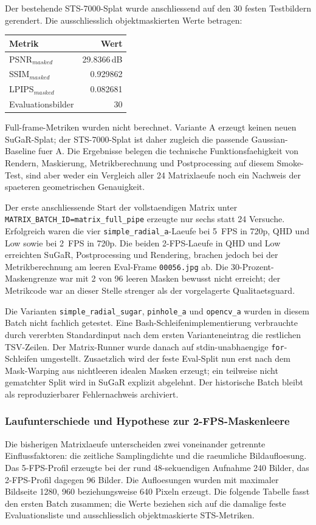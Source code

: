 \documentclass[12pt,a4paper]{article}
\begin{document}
Der bestehende STS-7000-Splat wurde anschliessend auf den 30 festen Testbildern
gerendert. Die ausschliesslich objektmaskierten Werte betragen:
\begin{center}
\begin{tabular}{l r}
\textbf{Metrik} & \textbf{Wert}\\
\hline
PSNR$_{masked}$ & 29.8366\,dB\\
SSIM$_{masked}$ & 0.929862\\
LPIPS$_{masked}$ & 0.082681\\
Evaluationsbilder & 30\\
\end{tabular}
\end{center}
Full-frame-Metriken wurden nicht berechnet. Variante A erzeugt keinen neuen
SuGaR-Splat; der STS-7000-Splat ist daher zugleich die passende Gaussian-
Baseline fuer A. Die Ergebnisse belegen die technische Funktionsfaehigkeit von
Rendern, Maskierung, Metrikberechnung und Postprocessing auf diesem
Smoke-Test, sind aber weder ein Vergleich aller 24 Matrixlaeufe noch ein
Nachweis der spaeteren geometrischen Genauigkeit.

Der erste anschliessende Start der vollstaendigen Matrix unter
\texttt{MATRIX\_BATCH\_ID=matrix\_full\_pipe} erzeugte nur sechs statt 24
Versuche. Erfolgreich waren die vier \texttt{simple\_radial\_a}-Laeufe bei
5~FPS in 720p, QHD und Low sowie bei 2~FPS in 720p. Die beiden 2-FPS-Laeufe in
QHD und Low erreichten SuGaR, Postprocessing und Rendering, brachen jedoch bei
der Metrikberechnung am leeren Eval-Frame \texttt{00056.jpg} ab. Die
30-Prozent-Maskengrenze war mit 2 von 96 leeren Masken bewusst nicht erreicht;
der Metrikcode war an dieser Stelle strenger als der vorgelagerte
Qualitaetsguard.

Die Varianten \texttt{simple\_radial\_sugar}, \texttt{pinhole\_a} und
\texttt{opencv\_a} wurden in diesem Batch nicht fachlich getestet. Eine
Bash-Schleifenimplementierung verbrauchte durch vererbten Standardinput nach
dem ersten Varianteneintrag die restlichen TSV-Zeilen. Der Matrix-Runner wurde
danach auf stdin-unabhaengige \texttt{for}-Schleifen umgestellt. Zusaetzlich
wird der feste Eval-Split nun erst nach dem Mask-Warping aus nichtleeren idealen
Masken erzeugt; ein teilweise nicht gematchter Split wird in SuGaR explizit
abgelehnt. Der historische Batch bleibt als reproduzierbarer Fehlernachweis
archiviert.

\subsubsection*{Laufunterschiede und Hypothese zur 2-FPS-Maskenleere}
Die bisherigen Matrixlaeufe unterscheiden zwei voneinander getrennte
Einflussfaktoren: die zeitliche Samplingdichte und die raeumliche
Bildaufloesung. Das 5-FPS-Profil erzeugte bei der rund 48-sekuendigen Aufnahme
240 Bilder, das 2-FPS-Profil dagegen 96 Bilder. Die Aufloesungen wurden mit
maximaler Bildseite 1280, 960 beziehungsweise 640 Pixeln erzeugt. Die
folgende Tabelle fasst den ersten Batch zusammen; die Werte beziehen sich auf
die damalige feste Evaluationsliste und ausschliesslich objektmaskierte
STS-Metriken.
\end{document}
